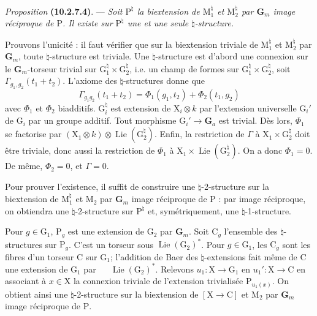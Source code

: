 \documentclass[11pt,leqno]{article}
\newcommand{\Page}[1]{\ifvmode\noindent\else\unskip\ \fi{\footnotesize\textcolor{gray}{[p.\,#1]}}\ \ignorespaces}
\begin{document}
\textit{Proposition} \textbf{(10.2.7.4)}. — \textit{Soit
\(\mathrm{P}^{\natural}\) la biextension de
\(\mathrm{M}_1^{\natural}\) et \(\mathrm{M}_2^{\natural}\) par
\(\mathbf{G}_m\) image réciproque de \(\mathrm{P}\). Il existe
sur \(\mathrm{P}^{\natural}\) une et une seule
\(\natural\)-structure.}

Prouvons l’unicité : il faut vérifier que sur la biextension
triviale de \(\mathrm{M}_1^{\natural}\) et
\(\mathrm{M}_2^{\natural}\) par \(\mathbf{G}_m\), toute
\(\natural\)-structure est triviale. Une \(\natural\)-structure
est d’abord une connexion sur le \(\mathbf{G}_m\)-torseur trivial
sur \(\mathrm{G}_1^{\natural}\times\mathrm{G}_2^{\natural}\),
i.e. un champ de formes sur
\(\mathrm{G}_1^{\natural}\times\mathrm{G}_2^{\natural}\),
soit \(\Gamma_{g_1,g_2}(t_1+t_2)\).
L’axiome des \(\natural\)-structures donne que
\[
\Gamma_{g_1g_2}(t_1+t_2)
=\Phi_1(g_1,t_2)+\Phi_2(t_1,g_2)
\]
avec \(\Phi_1\) et \(\Phi_2\) biadditifs.
\(\mathrm{G}_i^{\natural}\) est extension de
\(\mathrm{X}_i\otimes k\) par l’extension universelle
\(\mathrm{G}_i'\) de \(\mathrm{G}_i\) par un groupe additif.
Tout morphisme \(\mathrm{G}_i'\to\mathbf{G}_a\) est trivial.
Dès lors, \(\Phi_1\) se factorise par
\((\mathrm{X}_1\otimes k)\otimes
\operatorname{Lie}(\mathrm{G}_2^{\natural})\).
Enfin, la restriction de \(\Gamma\) à
\(\mathrm{X}_1\times\mathrm{G}_2^{\natural}\) doit être triviale,
donc aussi la restriction de \(\Phi_1\) à
\(\mathrm{X}_1\times\operatorname{Lie}(\mathrm{G}_2^{\natural})\).
On a donc \(\Phi_1=0\). De même, \(\Phi_2=0\), et \(\Gamma=0\).

Pour prouver l’existence, il suffit de construire une
\(\natural\)-2-structure sur la biextension de
\(\mathrm{M}_1^{\natural}\) et \(\mathrm{M}_2\) par
\(\mathbf{G}_m\) image réciproque de \(\mathrm{P}\) : par image
réciproque, on obtiendra une \(\natural\)-2-structure sur
\(\mathrm{P}^{\natural}\) et, symétriquement, une
\(\natural\)-1-structure.

Pour \(g\in\mathrm{G}_1\), \(\mathrm{P}_g\) est une extension
de \(\mathrm{G}_2\) par \(\mathbf{G}_m\).
Soit \(\mathrm{C}_g\) l’ensemble des \(\natural\)-structures sur
\(\mathrm{P}_g\). C’est un torseur sous
\(\operatorname{Lie}(\mathrm{G}_2)^{*}\).
Pour \(g\in\mathrm{G}_1\), les \(\mathrm{C}_g\) sont les fibres
d’un torseur \(\mathrm{C}\) sur \(\mathrm{G}_1\); l’addition
de Baer des \(\natural\)-extensions fait même de \(\mathrm{C}\)
une extension de \(\mathrm{G}_1\) par
\Page{66}
\(\operatorname{Lie}(\mathrm{G}_2)^{*}\).
Relevons \(u_1:\mathrm{X}\to\mathrm{G}_1\) en
\(u_1':\mathrm{X}\to\mathrm{C}\) en associant à
\(x\in\mathrm{X}\) la connexion triviale de l’extension
trivialisée \(\mathrm{P}_{u_1(x)}\).
On obtient ainsi une \(\natural\)-2-structure sur la biextension
de \([\mathrm{X}\to\mathrm{C}]\) et \(\mathrm{M}_2\) par
\(\mathbf{G}_m\) image réciproque de \(\mathrm{P}\).
\end{document}
